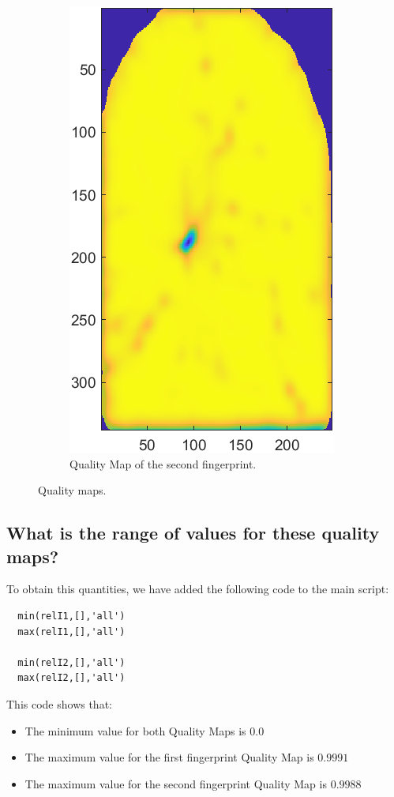 \documentclass[a4paper]{article}
\begin{document}
\begin{figure}[H]
\begin{subfigure}[t]{0.45\textwidth}
         \includegraphics[scale=0.8]{Figures/QMap2}
         \caption{Quality Map of the second fingerprint.}
     \end{subfigure}
    \caption{Quality maps.}
    \label{fig:ex3a}
\end{figure}


\subsection{ What is the range of values for these quality maps?}

To obtain this quantities, we have added the following code to the main script: 

\begin{verbatim}
  min(relI1,[],'all')
  max(relI1,[],'all')
  
  min(relI2,[],'all')
  max(relI2,[],'all')
\end{verbatim}

This code shows that:

\begin{itemize}
  \item The minimum value for both Quality Maps is \(0.0\)
  \item The maximum value for the first fingerprint Quality Map is \(0.9991\)
  \item The maximum value for the second fingerprint Quality Map is \(0.9988\)
\end{itemize}
\end{document}
